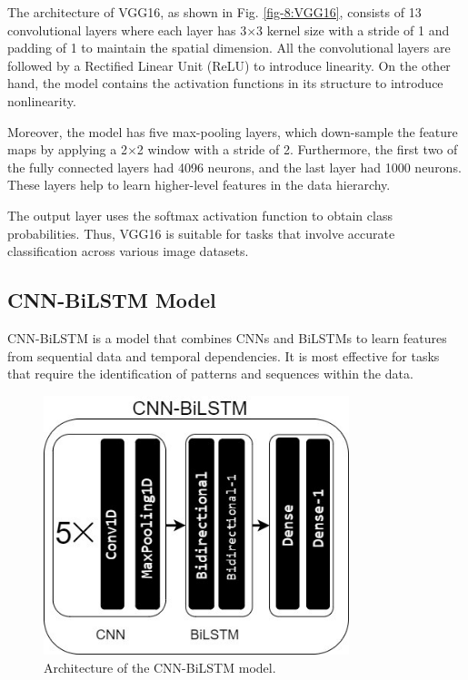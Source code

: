 \documentclass[conference]{IEEEtran}
\begin{document}
The architecture of VGG16, as shown in Fig. \ref{fig-8:VGG16}, consists of 13 convolutional layers where each layer has 3$\times$3 kernel size with a stride of 1 and padding of 1 to maintain the spatial dimension. All the convolutional layers are followed by a Rectified Linear Unit (ReLU) to introduce linearity. On the other hand, the model contains the activation functions in its structure to introduce nonlinearity.

Moreover, the model has five max-pooling layers, which down-sample the feature maps by applying a 2$\times$2 window with a stride of 2. Furthermore, the first two of the fully connected layers had 4096 neurons, and the last layer had 1000 neurons. These layers help to learn higher-level features in the data hierarchy.

The output layer uses the softmax activation function to obtain class probabilities. Thus, VGG16 is suitable for tasks that involve accurate classification across various image datasets.

\subsection{CNN-BiLSTM Model}

CNN-BiLSTM is a model that combines CNNs and BiLSTMs to learn features from sequential data and temporal dependencies. It is most effective for tasks that require the identification of patterns and sequences within the data.



\begin{figure}[htbp]
\centerline{\includegraphics[width=3.5in]{9-CNN-BiLSTM.jpg}}
\caption{Architecture of the CNN-BiLSTM model.}
\label{fig-9:CNN-BiLSTM}
\end{figure}
\end{document}
